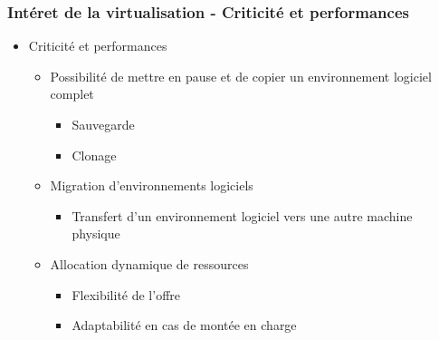  \begin{frame}
    \frametitle{Intéret de la virtualisation - Criticité et performances}
    \begin{itemize}
      \item Criticité et performances
      \begin{itemize}
        \item Possibilité de mettre en pause et de copier un environnement logiciel complet
        \begin{itemize}
          \item Sauvegarde
          \item Clonage
        \end{itemize}
        \item Migration d’environnements logiciels
        \begin{itemize}
          \item Transfert d’un environnement logiciel vers une autre machine physique
        \end{itemize}
        \item Allocation dynamique de ressources
        \begin{itemize}
          \item Flexibilité de l'offre
          \item Adaptabilité en cas de montée en charge 
        \end{itemize}
      \end{itemize}
    \end{itemize}
  \end{frame}
  
